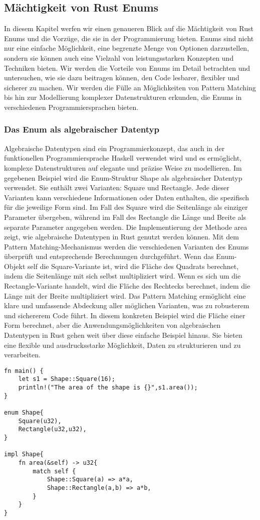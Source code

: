 \documentclass[a4paper, 1ppt]{article}
\begin{document}
\subsection{Mächtigkeit von Rust Enums}
In diesem Kapitel werfen wir einen genaueren Blick auf die Mächtigkeit von Rust Enums und die Vorzüge, die sie in der Programmierung bieten. Enums sind nicht nur eine einfache Möglichkeit, eine begrenzte Menge von Optionen darzustellen, sondern sie können auch eine Vielzahl von leistungsstarken Konzepten und Techniken bieten. Wir werden die Vorteile von Enums im Detail betrachten und untersuchen, wie sie dazu beitragen können, den Code lesbarer, flexibler und sicherer zu machen. Wir werden die Fülle an Möglichkeiten von Pattern Matching bis hin zur Modellierung komplexer Datenstrukturen erkunden, die Enums in verschiedenen Programmiersprachen bieten. 
\subsubsection{Das Enum als algebraischer Datentyp}
Algebraische Datentypen sind ein Programmierkonzept, das auch in der funktionellen Programmiersprache Haskell verwendet wird und es ermöglicht, komplexe Datenstrukturen auf elegante und präzise Weise zu modellieren. 
Im gegebenen Beispiel wird die Enum-Struktur Shape als algebraischer Datentyp verwendet. Sie enthält zwei Varianten: Square und Rectangle. Jede dieser Varianten kann verschiedene Informationen oder Daten enthalten, die spezifisch für die jeweilige Form sind. Im Fall des Square wird die Seitenlänge als einziger Parameter übergeben, während im Fall des Rectangle die Länge und Breite als separate Parameter angegeben werden.
Die Implementierung der Methode area zeigt, wie algebraische Datentypen in Rust genutzt werden können. Mit dem Pattern Matching-Mechanismus werden die verschiedenen Varianten des Enums überprüft und entsprechende Berechnungen durchgeführt. Wenn das Enum-Objekt self die Square-Variante ist, wird die Fläche des Quadrats berechnet, indem die Seitenlänge mit sich selbst multipliziert wird. Wenn es sich um die Rectangle-Variante handelt, wird die Fläche des Rechtecks berechnet, indem die Länge mit der Breite multipliziert wird.
Das Pattern Matching ermöglicht eine klare und umfassende Abdeckung aller möglichen Varianten, was zu robusterem und sichererem Code führt. In diesem konkreten Beispiel wird die Fläche einer Form berechnet, aber die Anwendungsmöglichkeiten von algebraischen Datentypen in Rust gehen weit über diese einfache Beispiel hinaus. Sie bieten eine flexible und ausdrucksstarke Möglichkeit, Daten zu strukturieren und zu verarbeiten.
\begin{verbatim}
fn main() {
    let s1 = Shape::Square(16);
    println!("The area of the shape is {}",s1.area());
}

enum Shape{
    Square(u32),
    Rectangle(u32,u32),
}

impl Shape{
    fn area(&self) -> u32{
        match self {
            Shape::Square(a) => a*a,
            Shape::Rectangle(a,b) => a*b,
        }
    }
}
\end{verbatim}
\end{document}
